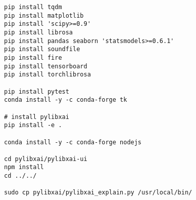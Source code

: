 \documentclass[
    bindingoffset=5mm,  %
    footnoteindent=3mm, %
    hyphenation=true    %
]{src/wut-thesis}
\begin{document}
\begin{verbatim}
pip install tqdm
pip install matplotlib
pip install 'scipy>=0.9'
pip install librosa
pip install pandas seaborn 'statsmodels>=0.6.1'
pip install soundfile
pip install fire
pip install tensorboard
pip install torchlibrosa

pip install pytest
conda install -y -c conda-forge tk

# install pylibxai
pip install -e .

conda install -y -c conda-forge nodejs

cd pylibxai/pylibxai-ui
npm install
cd ../../

sudo cp pylibxai/pylibxai_explain.py /usr/local/bin/
\end{verbatim}

\clearpage
\end{document}
